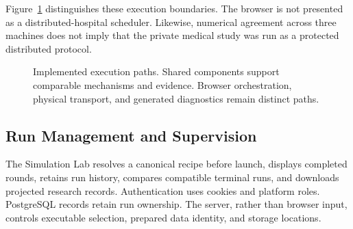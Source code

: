 \documentclass[conference,letterpaper]{IEEEtran}
\begin{document}
Figure~\ref{fig:architecture} distinguishes these execution boundaries. The browser is not presented as a distributed-hospital scheduler. Likewise, numerical agreement across three machines does not imply that the private medical study was run as a protected distributed protocol.

\begin{figure}[t]
\centering
{}
\caption{Implemented execution paths. Shared components support comparable mechanisms and evidence. Browser orchestration, physical transport, and generated diagnostics remain distinct paths.}
\label{fig:architecture}
\end{figure}

\subsection{Run Management and Supervision}
The Simulation Lab resolves a canonical recipe before launch, displays completed rounds, retains run history, compares compatible terminal runs, and downloads projected research records. Authentication uses cookies and platform roles. PostgreSQL records retain run ownership. The server, rather than browser input, controls executable selection, prepared data identity, and storage locations.
\end{document}
